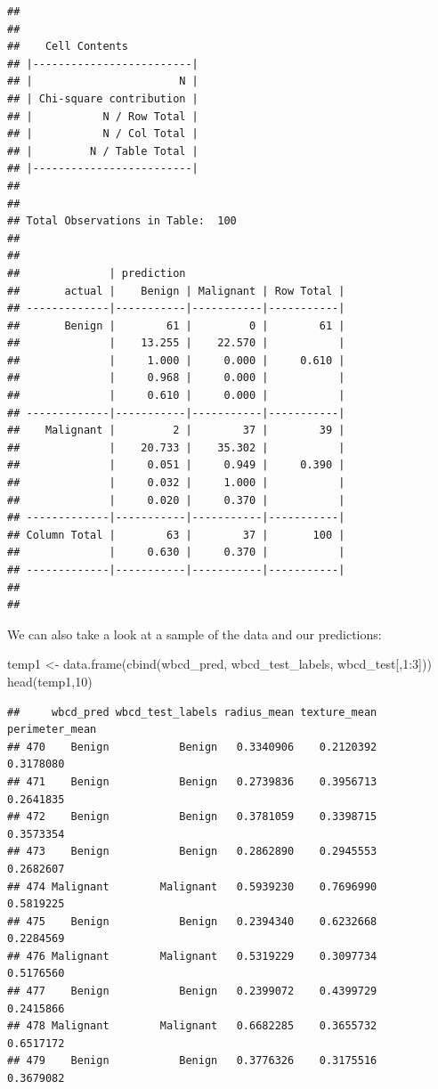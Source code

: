 \documentclass[
]{article}
\newenvironment{Shaded}{\begin{snugshade}}{\end{snugshade}}
\newcommand{\DecValTok}[1]{\textcolor[rgb]{0.00,0.00,0.81}{#1}}
\newcommand{\FunctionTok}[1]{\textcolor[rgb]{0.00,0.00,0.00}{#1}}
\newcommand{\NormalTok}[1]{#1}
\newcommand{\OtherTok}[1]{\textcolor[rgb]{0.56,0.35,0.01}{#1}}
\newcommand{\SpecialCharTok}[1]{\textcolor[rgb]{0.00,0.00,0.00}{#1}}
\begin{document}
\begin{verbatim}
## 
##  
##    Cell Contents
## |-------------------------|
## |                       N |
## | Chi-square contribution |
## |           N / Row Total |
## |           N / Col Total |
## |         N / Table Total |
## |-------------------------|
## 
##  
## Total Observations in Table:  100 
## 
##  
##              | prediction 
##       actual |    Benign | Malignant | Row Total | 
## -------------|-----------|-----------|-----------|
##       Benign |        61 |         0 |        61 | 
##              |    13.255 |    22.570 |           | 
##              |     1.000 |     0.000 |     0.610 | 
##              |     0.968 |     0.000 |           | 
##              |     0.610 |     0.000 |           | 
## -------------|-----------|-----------|-----------|
##    Malignant |         2 |        37 |        39 | 
##              |    20.733 |    35.302 |           | 
##              |     0.051 |     0.949 |     0.390 | 
##              |     0.032 |     1.000 |           | 
##              |     0.020 |     0.370 |           | 
## -------------|-----------|-----------|-----------|
## Column Total |        63 |        37 |       100 | 
##              |     0.630 |     0.370 |           | 
## -------------|-----------|-----------|-----------|
## 
## 
\end{verbatim}

We can also take a look at a sample of the data and our predictions:

\begin{Shaded}
\begin{Highlighting}[]
\NormalTok{temp1 }\OtherTok{\textless{}{-}} \FunctionTok{data.frame}\NormalTok{(}\FunctionTok{cbind}\NormalTok{(wbcd\_pred, wbcd\_test\_labels, wbcd\_test[,}\DecValTok{1}\SpecialCharTok{:}\DecValTok{3}\NormalTok{]))}
\FunctionTok{head}\NormalTok{(temp1,}\DecValTok{10}\NormalTok{)}
\end{Highlighting}
\end{Shaded}

\begin{verbatim}
##     wbcd_pred wbcd_test_labels radius_mean texture_mean perimeter_mean
## 470    Benign           Benign   0.3340906    0.2120392      0.3178080
## 471    Benign           Benign   0.2739836    0.3956713      0.2641835
## 472    Benign           Benign   0.3781059    0.3398715      0.3573354
## 473    Benign           Benign   0.2862890    0.2945553      0.2682607
## 474 Malignant        Malignant   0.5939230    0.7696990      0.5819225
## 475    Benign           Benign   0.2394340    0.6232668      0.2284569
## 476 Malignant        Malignant   0.5319229    0.3097734      0.5176560
## 477    Benign           Benign   0.2399072    0.4399729      0.2415866
## 478 Malignant        Malignant   0.6682285    0.3655732      0.6517172
## 479    Benign           Benign   0.3776326    0.3175516      0.3679082
\end{verbatim}
\end{document}
